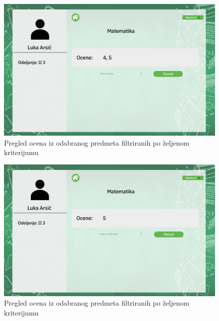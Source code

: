 \documentclass{article}
\begin{document}
\begin{figure} [!ht]
    \begin{center}
        \includegraphics[scale=0.22]{../UI/Ucenik/Student_subject_math_class.png}
    \end{center}
\caption{Pregled ocena iz odabranog predmeta filtriranih po željenom kriterijumu}
\end{figure}

\begin{figure} [!ht]
    \begin{center}
        \includegraphics[scale=0.22]{../UI/Ucenik/Student_subject_math_activity.png}
    \end{center}
\caption{Pregled ocena iz odabranog predmeta filtriranih po željenom kriterijumu}
\end{figure}
\end{document}
